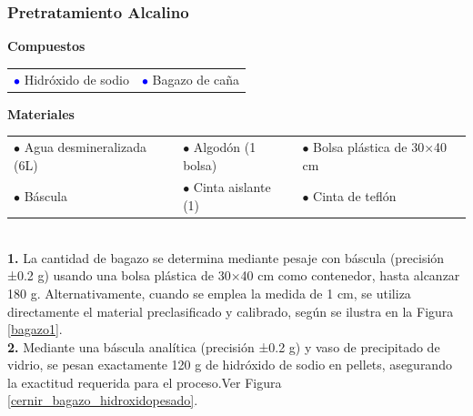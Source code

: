 \documentclass[12pt]{article}
\begin{document}
			
			
						\subsubsection{Pretratamiento Alcalino}
			
			
			\textbf{Compuestos} 
			
			\begin{tabular}{p{0.3\textwidth}p{}}
		\textcolor{blue}{$\bullet$} Hidróxido de sodio &	\textcolor{blue}{$\bullet$} Bagazo de caña 
			\end{tabular}
			
			
			\textbf{Materiales} 
			
					
\begin{tabular}{p{}p{}p{}}
	$\bullet$ Agua desmineralizada (6L) & $\bullet$ Algodón (1 bolsa) & $\bullet$ Bolsa plástica de 30×40 cm \\
	$\bullet$ Báscula & $\bullet$ Cinta aislante (1) & $\bullet$ Cinta de teflón
\end{tabular}
\\
	
			\textbf{1.}	La cantidad de bagazo se determina mediante pesaje con báscula (precisión ±0.2 g) usando una bolsa plástica de 30×40 cm como contenedor, hasta alcanzar 180 g. Alternativamente, cuando se emplea la medida de 1 cm, se utiliza directamente el material preclasificado y calibrado, según se ilustra en la Figura \ref{bagazo1}.\\
					
			\textbf{2.} Mediante una báscula analítica (precisión ±0.2 g) y vaso de precipitado de vidrio, se pesan exactamente 120 g de hidróxido de sodio en pellets, asegurando la exactitud requerida para el proceso.Ver Figura \ref{cernir_bagazo_hidroxidopesado}.
		
			
			
\end{document}
